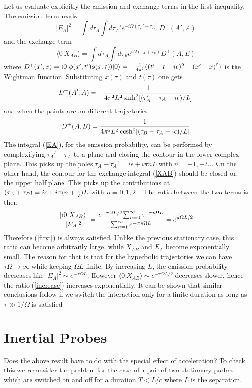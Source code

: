 \documentclass[12pt]{article}
\newcommand{\beq}{\begin{equation}}
\newcommand{\eeq}{\end{equation}}
\def \la {\langle}
\def \ra {\rangle}
\begin{document}
Let us evaluate explicitly the emission and exchange terms
in the first inequality.
The emission term reads
\beq
|E_A|^2 = \int d\tau_A \int d\tau_A'
e^{-i\Omega(\tau_A'-\tau_A)} D^+(A',A)
\label{EA}
\eeq
and the  exchange term
\beq
\la 0|X_{AB}\ra = \int d\tau_A \int d\tau_B
e^{i\Omega(\tau_A+\tau_B)} D^+(A,B)
\label{XAB}
\eeq
where $D^+(x',x)=\la0 |\phi(x',t')\phi(x,t))|0\ra= -{1\over4\pi^2}
( (t'-t-i\epsilon)^2-({\vec x'} -{\vec  x})^2)$
is the Wightman function.
Substituting $x(\tau)$ and $t(\tau)$ one gets
\cite{birrell&davies}
\beq
D^+ (A',A) =- {1\over  4 \pi^2 L^2 \sinh^2[
( \tau_A'-\tau_A -i\epsilon)/L]}
\eeq
and when the points are on different trajectories
\beq    D^+(A,B)
 ={1\over 4 \pi^2 L^2\cosh^2[(\tau_B+\tau_A-i\epsilon)/L]}
\eeq
The integral (\ref{EA}), for the emission probability, can be
performed
by complexifying $\tau_A'-\tau_A$ to a plane and closing
the contour in the lower complex plane. This picks up the poles
$\tau_A-\tau_A' = i\epsilon + i\pi nL$ with $n= -1,-2...$
On the other hand, the contour for the exchange integral
(\ref{XAB})
should be closed on the upper half plane. This picks up the
contributions at
$(\tau_A+\tau_B)=i\epsilon + i\pi (n+{1\over2})L $  with
$n=0,1,2...$
The ratio between the two terms is then
\beq
{|\la 0|X_{AB}\ra| \over |E_A|^2}
= { e^{-\pi
\Omega L /2}{\sum_{n=0}^\infty e^{-\pi n\Omega L} } \over
 \sum_{n=1}^\infty e^{-\pi n\Omega L} } = e^{\pi\Omega L/2}
\label{increase}
\eeq
Therefore (\ref{first}) is always satisfied.
Unlike the previous stationary case, this ratio can become
arbitrarily large, while $X_{AB}$ and $E_A$ become exponentially
small.
The reason for that is that for the hyperbolic trajectories
we can have $\tau\Omega\to \infty$ while keeping $\Omega L$
finite.
By increasing $L$, the emission probability decreases like
$|E_A|^2\sim e^{-\pi \Omega L}$.
However $\la0|X_{AB}\ra\sim e^{-\pi \Omega L/2}$
decreases slower, hence the ratio (\ref{increase})
increases exponentially. It can be shown that similar conclusions
follow
if we switch the interaction only for a finite duration as long
as $\tau\gg 1/\Omega$ is satisfied.


\section{\bf Inertial Probes}

Does the above result have to do with the special effect of
acceleration? To check this we reconsider the problem for the
case of a pair of two stationary probes which are switched
on and off for a duration $T<L/c$ where $L$ is the separation.
\end{document}
